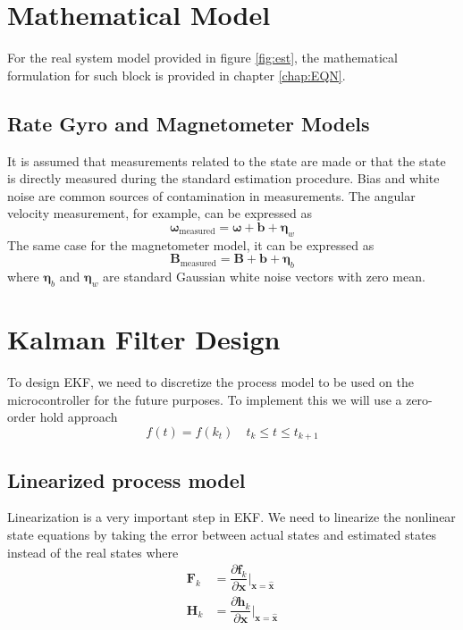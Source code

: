 \section{Mathematical Model}
For the real system model provided in figure \ref{fig:est}, the mathematical formulation for such block is provided in chapter \ref{chap:EQN}.
\subsection{Rate Gyro and Magnetometer Models}
It is assumed that measurements related to the state are made or that the state is directly measured during the standard estimation procedure. Bias and white noise are common sources of contamination in measurements. The angular velocity measurement, for example, can be expressed as
\begin{equation}
    \boldsymbol{\omega}_{\text{measured}} = \boldsymbol{\omega} + \mathbf{b} + \boldsymbol{\eta}_w
\end{equation}
The same case for the magnetometer model, it can be expressed as
\begin{equation}
    \mathbf{B}_{\text{measured}} = \mathbf{B} + \mathbf{b} + \boldsymbol{\eta}_b
\end{equation}
where $\boldsymbol{\eta}_b$ and $\boldsymbol{\eta}_w$ are standard Gaussian white noise vectors with zero mean.

\section{Kalman Filter Design}
To design EKF, we need to discretize the process model to be used on the microcontroller for the future purposes. To implement this we will use  a zero-order hold approach
\begin{equation}
    f(t) = f(k_t) \quad t_k \leq t \leq t_{k+1}
\end{equation}

\subsection{Linearized process model }
Linearization is a very important step in EKF. We need to linearize the nonlinear state equations by taking the error between actual states and estimated states instead of the real states where
\begin{align}
  \mathbf{F}_k &= \dfrac{\partial \mathbf{f}_k}{\partial \mathbf{x}} |_{\mathbf{x}=\mathbf{\hat{x}}} \\
  \mathbf{H}_k &= \dfrac{\partial \mathbf{h}_k}{\partial \mathbf{x}} |_{\mathbf{x}=\mathbf{\hat{x}}}
\end{align}

